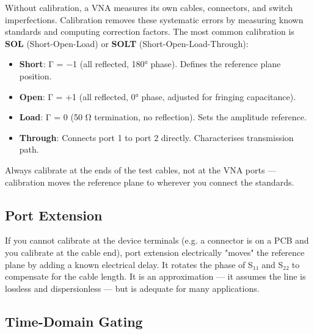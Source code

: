       

Without calibration, a VNA measures its own cables, connectors, and switch imperfections. Calibration removes these systematic errors by measuring known standards and computing correction factors. The most common calibration is \textbf{SOL} (Short-Open-Load) or \textbf{SOLT} (Short-Open-Load-Through):


      
\begin{itemize}

        \item \textbf{Short}: Γ = −1 (all reflected, 180° phase). Defines the reference plane position.

        \item \textbf{Open}: Γ = +1 (all reflected, 0° phase, adjusted for fringing capacitance).

        \item \textbf{Load}: Γ = 0 (50 Ω termination, no reflection). Sets the amplitude reference.

        \item \textbf{Through}: Connects port 1 to port 2 directly. Characterises transmission path.

      
\end{itemize}

      

Always calibrate at the ends of the test cables, not at the VNA ports — calibration moves the reference plane to wherever you connect the standards.

      

\subsection{Port Extension}

      

If you cannot calibrate at the device terminals (e.g. a connector is on a PCB and you calibrate at the cable end), port extension electrically "moves" the reference plane by adding a known electrical delay. It rotates the phase of S₁₁ and S₂₂ to compensate for the cable length. It is an approximation — it assumes the line is lossless and dispersionless — but is adequate for many applications.

      

\subsection{Time-Domain Gating}

